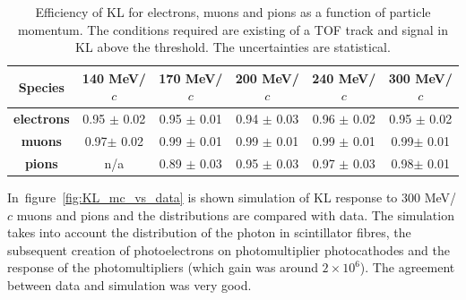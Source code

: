        
  \begin{table}[htb]
  	\begin{center}
  		\begin{tabular}{c|c|c|c|c|c} 
  			\hline
  			\textbf{Species} &\textbf{140 MeV/$c$} & \textbf{170 MeV/$c$} & \textbf{200 MeV/$c$}	&\textbf{240 MeV/$c$} &\textbf{300 MeV/$c$}\\
  			\hline
  			\textbf{electrons} & 0.95 $\pm$ 0.02  & 0.95 $\pm$ 0.01 & 0.94 $\pm$ 0.03 &  0.96 $\pm$ 0.02 &  0.95 $\pm$ 0.02 \\
  			\hline
  			\textbf{muons} &  0.97$\pm$ 0.02 & 0.99 $\pm$ 0.01  & 0.99 $\pm$  0.01 & 0.99 $\pm$ 0.01 & 0.99$\pm$ 0.01\\
  			\hline
  			\textbf{pions} &  n/a  & 0.89 $\pm$ 0.03  & 0.95 $\pm$ 0.03 & 0.97 $\pm$ 0.03 & 0.98$\pm$ 0.01\\
  			\hline
  		\end{tabular}
  		\caption{Efficiency of KL for electrons, muons and pions as a function of particle momentum. The conditions required are existing of a TOF track and signal in KL above the threshold. The uncertainties are statistical.}
  		\label{tab:KL_eff}
  	\end{center}
  \end{table}

In~figure~\ref{fig:KL_mc_vs_data} is shown simulation of KL response to 300 MeV/$c$ muons and pions and the distributions are compared with data.
The simulation takes into account the distribution of the photon in scintillator fibres, the subsequent creation of photoelectrons on photomultiplier photocathodes and the response of the photomultipliers (which gain was around $2 \times 10^6$).
The agreement between data and simulation was very good.

